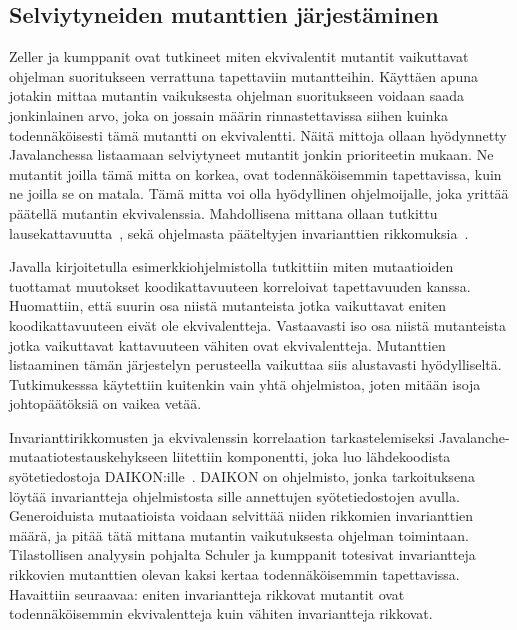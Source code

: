 \documentclass{tktltiki}
\begin{document}
\subsection{Selviytyneiden mutanttien järjestäminen}
Zeller ja kumppanit ovat tutkineet miten ekvivalentit mutantit vaikuttavat ohjelman suoritukseen verrattuna tapettaviin mutantteihin. Käyttäen apuna jotakin mittaa mutantin vaikuksesta ohjelman suoritukseen voidaan saada jonkinlainen arvo, joka on jossain määrin rinnastettavissa siihen kuinka todennäköisesti tämä mutantti on ekvivalentti. Näitä mittoja ollaan hyödynnetty Javalanchessa listaamaan selviytyneet mutantit jonkin prioriteetin mukaan. Ne mutantit joilla tämä mitta on korkea, ovat todennäköisemmin tapettavissa, kuin ne joilla se on matala. Tämä mitta voi olla hyödyllinen ohjelmoijalle, joka yrittää päätellä mutantin ekvivalenssia. Mahdollisena mittana ollaan tutkittu lausekattavuutta~\cite{GrunSZ09}, sekä ohjelmasta pääteltyjen invarianttien rikkomuksia~\cite{SchulerDZ09}.

Javalla kirjoitetulla esimerkkiohjelmistolla tutkittiin miten mutaatioiden tuottamat muutokset koodikattavuuteen korreloivat tapettavuuden kanssa. Huomattiin, että suurin osa niistä mutanteista jotka vaikuttavat eniten koodikattavuuteen eivät ole ekvivalentteja. Vastaavasti iso osa niistä mutanteista jotka vaikuttavat kattavuuteen vähiten ovat ekvivalentteja. Mutanttien listaaminen tämän järjestelyn perusteella vaikuttaa siis alustavasti hyödylliseltä. Tutkimukesssa käytettiin kuitenkin vain yhtä ohjelmistoa, joten mitään isoja johtopäätöksiä on vaikea vetää.

Invarianttirikkomusten ja ekvivalenssin korrelaation tarkastelemiseksi Javalanche-mutaatiotestauskehykseen liitettiin komponentti, joka luo lähdekoodista syötetiedostoja DAIKON:ille~\cite{ErnstPGMPTX2007}. DAIKON on ohjelmisto, jonka tarkoituksena löytää invariantteja ohjelmistosta sille annettujen syötetiedostojen avulla. Generoiduista mutaatioista voidaan selvittää niiden rikkomien invarianttien määrä, ja pitää tätä mittana mutantin vaikutuksesta ohjelman toimintaan. Tilastollisen analyysin pohjalta Schuler ja kumppanit totesivat invariantteja rikkovien mutanttien olevan kaksi kertaa todennäköisemmin tapettavissa. Havaittiin seuraavaa: eniten invariantteja rikkovat mutantit ovat todennäköisemmin ekvivalentteja kuin vähiten invariantteja rikkovat.
\end{document}
